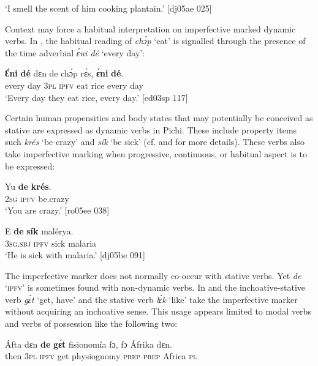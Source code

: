 \glt ‘I smell the scent of him cooking plantain.’ [dj05ae 025]
\z

Context may force a habitual interpretation on imperfective marked dynamic verbs. In , the habitual reading of \textit{chɔ́p} ‘eat’ is signalled through the presence of the time adverbial \textit{ɛ́ni dé} ‘every day’:


\ea%
    \label{ex:key:330}
    \gll \textbf{Ɛ́ni}    \textbf{dé}  dɛn  de  chɔ́p  rɛ́s,  \textbf{ɛ́ni}    \textbf{dé}.\\
every  day  \textsc{3pl}  \textsc{ipfv}  eat    rice  every  day\\

\glt ‘Every day they eat rice, every day.’ [ed03sp 117]
\z

Certain human propensities and body states that may potentially be conceived as stative are expressed as dynamic verbs in Pichi. These include property items such \textit{krés} ‘be crazy’ and \textit{sík} ‘be sick’ (cf.  and  for more details). These verbs also take imperfective marking when progressive, continuous, or habitual aspect is to be expressed: 


\ea%
    \label{ex:key:331}
    \gll Yu  \textbf{de} \textbf{krés}.\\
\textsc{2sg}  \textsc{ipfv}  be.crazy\\
\glt ‘You are crazy.’ [ro05ee 038]
\z


\ea%
    \label{ex:key:332}
    \gll E    \textbf{de} \textbf{sík}  malérya.\\
\textsc{3sg.sbj}  \textsc{ipfv}  sick  malaria\\

\glt ‘He is sick with malaria.’ [dj05be 091]
\z

The imperfective marker does not normally co-occur with stative verbs. Yet \textit{de} ‘\textsc{ipfv}’ is sometimes found with non-dynamic verbs. In  and  the inchoative-stative verb \textit{gɛ́t} ‘get, have’ and the stative verb \textit{lɛ́k} ‘like’ take the imperfective marker without acquiring an inchoative sense. This usage appears limited to modal verbs and verbs of possession like the following two:


\ea%
    \label{ex:key:333}
    \gll \'{A}fta    dɛn  \textbf{de}  \textbf{gɛ́t}  fisionomía    fɔ,  fɔ  \'{A}frika  dɛn.\\
then  \textsc{3pl}  \textsc{ipfv}  get  physiognomy    \textsc{prep}  \textsc{prep}  Africa  \textsc{pl}\\

